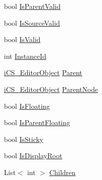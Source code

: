 \begin{DoxyCompactItemize}
\item 
bool \hyperlink{classi_c_s___editor_object_a586714b6e3231c809bdd500354d51fe4}{Is\+Parent\+Valid}
\item 
bool \hyperlink{classi_c_s___editor_object_aa1a0097087ff84f9c2a6577a2dcb35df}{Is\+Source\+Valid}
\item 
bool \hyperlink{classi_c_s___editor_object_aa04751488397ad895b430e86b042c364}{Is\+Valid}
\item 
int \hyperlink{classi_c_s___editor_object_a496d95ff09e943db2635ef2f22a4b952}{Instance\+Id}
\item 
\hyperlink{classi_c_s___editor_object}{i\+C\+S\+\_\+\+Editor\+Object} \hyperlink{classi_c_s___editor_object_a0fbec1035ca6324d35ac0b65ec976f4c}{Parent}
\item 
\hyperlink{classi_c_s___editor_object}{i\+C\+S\+\_\+\+Editor\+Object} \hyperlink{classi_c_s___editor_object_a227cca856ea50b90048515bcb71062c5}{Parent\+Node}
\item 
bool \hyperlink{classi_c_s___editor_object_a1ad80a4047294a71db990e454419f2f2}{Is\+Floating}
\item 
bool \hyperlink{classi_c_s___editor_object_aff19b2e9012cd0fdec323fc061a82ec5}{Is\+Parent\+Floating}
\item 
bool \hyperlink{classi_c_s___editor_object_a94884655fd1d9756256ea94dcb4cf411}{Is\+Sticky}
\item 
bool \hyperlink{classi_c_s___editor_object_abf2c7ffc1d7410cb9aa1bad17b30eb1b}{Is\+Display\+Root}
\item 
List$<$ int $>$ \hyperlink{classi_c_s___editor_object_a32b9a56c02c9f025bcc66c52180895a0}{Children}

\end{DoxyCompactItemize}
